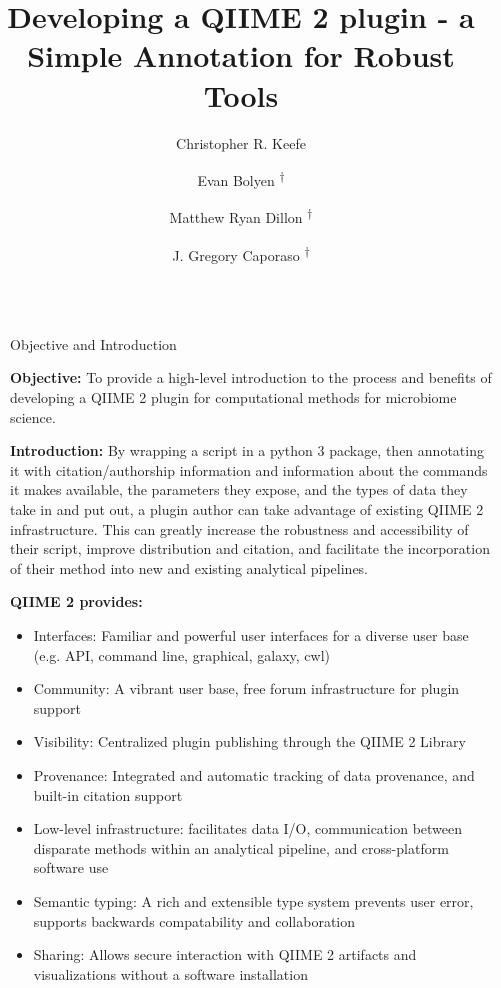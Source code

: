 \documentclass[final]{beamer}
\title{Developing a QIIME 2 plugin - a Simple Annotation for Robust Tools}
\author{Christopher R. Keefe \and Evan Bolyen \textsuperscript{†} \and Matthew Ryan Dillon \textsuperscript{†} \and J. Gregory Caporaso \textsuperscript{†} }
\institute[shortinst]{The Pathogen and Microbiome Institute at Northern Arizona University \\
{\footnotesize \textsuperscript{†} Advisors} }
\newlength{\sepwidth}
\newlength{\colwidth}
\newcommand{\separatorcolumn}{\begin{column}{\sepwidth}\end{column}}
\begin{document}
\begin{frame}[t]
\begin{columns}[t]
\separatorcolumn

\begin{column}{\colwidth}

  \begin{block}{Objective and Introduction}

    \textbf{Objective:} To provide a high-level introduction to the process and
     benefits of developing a  QIIME 2 \cite{10.7287/peerj.preprints.27295v1}
     plugin for computational methods for microbiome science.
    \hfill\break

    \textbf{Introduction:} By wrapping a script in a python 3 package, then
    annotating it with citation/authorship information and information about
    the commands it makes available, the parameters they expose, and the types
    of data they take in and put out, a plugin author can take advantage of
    existing QIIME 2 infrastructure. This can greatly increase the robustness
    and accessibility of their script, improve distribution and citation, and
    facilitate the incorporation of their method into new and existing
    analytical pipelines.
    \hfill\break

    \textbf{QIIME 2 provides:}
    \begin{itemize}
      \item Interfaces: Familiar and powerful user interfaces for a diverse
      user base (e.g. API, command line, graphical, galaxy, cwl)
      \item Community: A vibrant user base, free forum infrastructure for
      plugin support
      \item Visibility: Centralized plugin publishing through the QIIME 2
      Library
      \item Provenance: Integrated and automatic tracking of data provenance,
      and built-in citation support
      \item Low-level infrastructure: facilitates data I/O, communication
      between disparate methods within an analytical pipeline, and
      cross-platform software use
      \item Semantic typing: A rich and extensible type system prevents user
      error, supports backwards compatability and collaboration
      \item Sharing: Allows secure interaction with QIIME 2 artifacts and
      visualizations without a software installation
    \end{itemize}
  \end{block}


\end{column}
\end{columns}
\end{frame}
\end{document}
